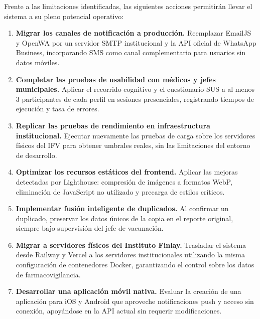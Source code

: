 \begin{recomendations}
\label{ref:recomendations}

Frente a las limitaciones identificadas, las siguientes acciones permitirán llevar el sistema a su pleno potencial operativo:

\begin{enumerate}
    \item \textbf{Migrar los canales de notificación a producción.} Reemplazar EmailJS y OpenWA por un servidor SMTP institucional y la API oficial de WhatsApp Business, incorporando SMS como canal complementario para usuarios sin datos móviles.

    \item \textbf{Completar las pruebas de usabilidad con médicos y jefes municipales.} Aplicar el recorrido cognitivo y el cuestionario SUS a al menos 3 participantes de cada perfil en sesiones presenciales, registrando tiempos de ejecución y tasa de errores.

    \item \textbf{Replicar las pruebas de rendimiento en infraestructura institucional.} Ejecutar nuevamente las pruebas de carga sobre los servidores físicos del IFV para obtener umbrales reales, sin las limitaciones del entorno de desarrollo.

    \item \textbf{Optimizar los recursos estáticos del frontend.} Aplicar las mejoras detectadas por Lighthouse: compresión de imágenes a formatos WebP, eliminación de JavaScript no utilizado y precarga de estilos críticos.

    \item \textbf{Implementar fusión inteligente de duplicados.} Al confirmar un duplicado, preservar los datos únicos de la copia en el reporte original, siempre bajo supervisión del jefe de vacunación.

    \item \textbf{Migrar a servidores físicos del Instituto Finlay.} Trasladar el sistema desde Railway y Vercel a los servidores institucionales utilizando la misma configuración de contenedores Docker, garantizando el control sobre los datos de farmacovigilancia.

    \item \textbf{Desarrollar una aplicación móvil nativa.} Evaluar la creación de una aplicación para iOS y Android que aproveche notificaciones push y acceso sin conexión, apoyándose en la API actual sin requerir modificaciones.
\end{enumerate}

\end{recomendations}